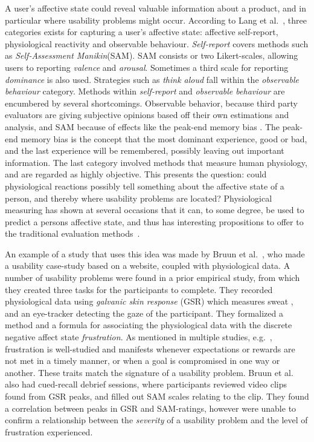 A user's affective state could reveal valuable information about a product, and in particular where usability problems might occur. 
According to Lang et al.~\cite{BRADLEY199449}, three categories exists for capturing a user's affective state: affective self-report, physiological reactivity and
observable behaviour. 
\textit{Self-report} covers methods such as \textit{Self-Assessment Manikin}(SAM). SAM consists or two Likert-scales,
allowing users to reporting \textit{valence} and \textit{arousal}. Sometimes a third scale for reporting
\textit{dominance} is also used.
Strategies such as \textit{think aloud} fall within the \textit{observable behaviour} category.
Methods within \textit{self-report} and \textit{observable behaviour} are encumbered by several shortcomings.
Observable behavior, because third party evaluators are giving subjective opinions based off their own estimations and
analysis, and SAM because of effects like the peak-end memory bias \cite{cockburn_peakend}.
The peak-end memory bias is the concept that the most dominant experience, good or bad, and the last experience will be
remembered, possibly leaving out important information.
The last category involved methods that measure human physiology, and are regarded as highly objective.
This presents the question: could physiological reactions possibly tell something about the affective state of a person,
and thereby where usability problems are located?
Physiological measuring has shown at several occasions that it can, to some degree, be used to predict a persons
affective state, and thus has interesting propositions to offer to the traditional evaluation methods~\cite{eeg_facial_expressions,fusion4,90_percent_eeg_emotion}.

An example of a study that uses this idea was made by Bruun et al.~\cite{LH-paper}, who made a usability case-study
based on a website, coupled with physiological data.
A number of usability problems were found in a prior empirical study, from which they created three tasks for the participants to complete.
They recorded physiological data using \textit{galvanic skin response} (GSR) which measures sweat \cite{gsr_calibration}, and an eye-tracker detecting the gaze of the participant.
They formalized a method and a formula for associating the physiological data with the discrete negative affect state \textit{frustration}.
As mentioned in multiple studies, e.g.~\cite{LH-paper,frustration_with_computers}, frustration is well-studied
and manifests whenever expectations or rewards are not met in a timely manner, or when a goal is compromised in one way or another.
These traits match the signature of a usability problem.
Bruun et al. also had cued-recall debrief sessions, where participants reviewed video clips found from GSR peaks, and filled out SAM scales relating to the clip. 
They found a correlation between peaks in GSR and SAM-ratings, however were unable to confirm a relationship between the
\textit{severity} of a usability problem and the level of frustration experienced.

